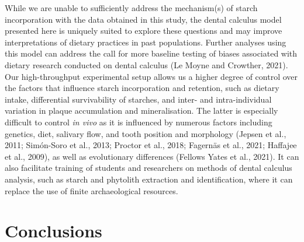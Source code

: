 \documentclass[utf8]{frontiers/frontiersSCNS}
\begin{document}
While we are unable to sufficiently address the
mechanism(s) of starch incorporation with the data obtained in this study,
the dental calculus model presented here is uniquely suited to explore
these questions and may improve interpretations of dietary practices in past
populations. Further analyses using this model can address the call for more
baseline testing of biases associated with dietary research conducted on dental calculus
(Le Moyne and Crowther, 2021).
Our high-throughput experimental setup allows us a
higher degree of control over the factors that influence starch incorporation and
retention, such as dietary intake, differential survivability of starches,
and inter- and intra-individual variation in plaque accumulation and mineralisation.
The latter is especially difficult to control \emph{in vivo} as it is influenced by
numerous factors including genetics, diet, salivary flow, and tooth position and
morphology
(Jepsen et al., 2011; Simón-Soro et al., 2013; Proctor et al., 2018; Fagernäs et al., 2021; Haffajee et al., 2009),
as well as evolutionary differences (Fellows Yates et al., 2021).
It can also facilitate training of students and researchers on methods of
dental calculus analysis, such as starch and phytolith extraction and
identification, where it can replace the use of finite archaeological resources.

\hypertarget{conclusions}{%
\section{Conclusions}\label{conclusions}}
\end{document}
